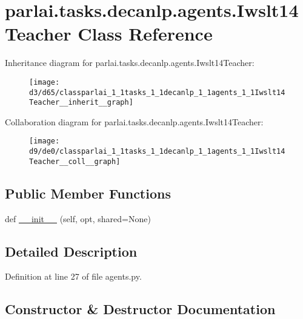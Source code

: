 \hypertarget{classparlai_1_1tasks_1_1decanlp_1_1agents_1_1Iwslt14Teacher}{}\section{parlai.\+tasks.\+decanlp.\+agents.\+Iwslt14\+Teacher Class Reference}
\label{classparlai_1_1tasks_1_1decanlp_1_1agents_1_1Iwslt14Teacher}


Inheritance diagram for parlai.\+tasks.\+decanlp.\+agents.\+Iwslt14\+Teacher\+:\nopagebreak
\begin{figure}[H]
\begin{center}
\leavevmode
\texttt{[image: d3/d65/classparlai\_1\_1tasks\_1\_1decanlp\_1\_1agents\_1\_1Iwslt14Teacher\_\_inherit\_\_graph]}
\end{center}
\end{figure}


Collaboration diagram for parlai.\+tasks.\+decanlp.\+agents.\+Iwslt14\+Teacher\+:\nopagebreak
\begin{figure}[H]
\begin{center}
\leavevmode
\texttt{[image: d9/de0/classparlai\_1\_1tasks\_1\_1decanlp\_1\_1agents\_1\_1Iwslt14Teacher\_\_coll\_\_graph]}
\end{center}
\end{figure}
\subsection*{Public Member Functions}
\begin{DoxyCompactItemize}
\item 
def \hyperlink{classparlai_1_1tasks_1_1decanlp_1_1agents_1_1Iwslt14Teacher_ab5be25b3d68b4bbaa180c280c67a7946}{\+\_\+\+\_\+init\+\_\+\+\_\+} (self, opt, shared=None)
\end{DoxyCompactItemize}


\subsection{Detailed Description}


Definition at line 27 of file agents.\+py.



\subsection{Constructor \& Destructor Documentation}
\mbox{\label{classparlai_1_1tasks_1_1decanlp_1_1agents_1_1Iwslt14Teacher_ab5be25b3d68b4bbaa180c280c67a7946}} 
